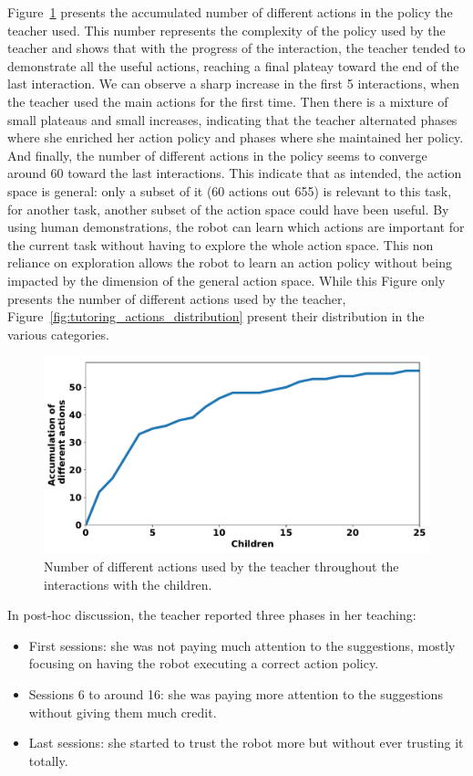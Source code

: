 Figure~\ref{fig:tutoring_actions} presents the accumulated number of different actions in the policy the teacher used. This number represents the complexity of the policy used by the teacher and shows that with the progress of the interaction, the teacher tended to demonstrate all the useful actions, reaching a final plateay toward the end of the last interaction. We can observe a sharp increase in the first 5 interactions, when the teacher used the main actions for the first time. Then there is a mixture of small plateaus and small increases, indicating that the teacher alternated phases where she enriched her action policy and phases where she maintained her policy. And finally, the number of different actions in the policy seems to converge around 60 toward the last interactions. This indicate that as intended, the action space is general: only a subset of it (60 actions out 655) is relevant to this task, for another task, another subset of the action space could have been useful. By using human demonstrations, the robot can learn which actions are important for the current task without having to explore the whole action space. This non reliance on exploration allows the robot to learn an action policy without being impacted by the dimension of the general action space. While this Figure only presents the number of different actions used by the teacher, Figure~\ref{fig:tutoring_actions_distribution} present their distribution in the various categories.

\begin{figure}[ht]
	\includegraphics[width=.85\linewidth]{./number_actions.pdf}
	\centering
	\caption{Number of different actions used by the teacher throughout the interactions with the children.}
	\label{fig:tutoring_actions}
\end{figure}


In post-hoc discussion, the teacher reported three phases in her teaching: 
\begin{itemize}
	\item First sessions: she was not paying much attention to the suggestions, mostly focusing on having the robot executing a correct action policy.
	\item Sessions 6 to around 16: she was paying more attention to the suggestions without giving them much credit.
	\item Last sessions: she started to trust the robot more but without ever trusting it totally.
\end{itemize}

